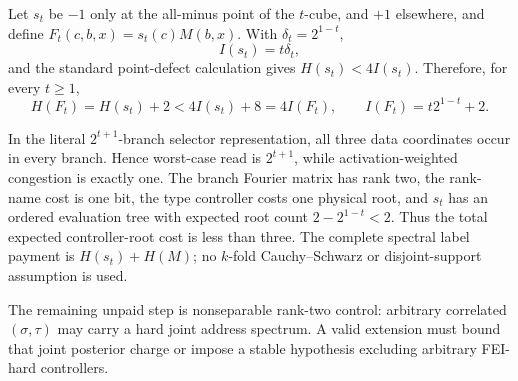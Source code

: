 Let $s_t$ be $-1$ only at the all-minus point of the $t$-cube, and $+1$
elsewhere, and define $F_t(c,b,x)=s_t(c)M(b,x)$.  With
$\delta_t=2^{1-t}$,
\[
 I(s_t)=t\delta_t,
\]
and the standard point-defect calculation gives $H(s_t)<4I(s_t)$.
Therefore, for every $t\ge1$,
\[
 H(F_t)=H(s_t)+2<4I(s_t)+8=4I(F_t),
 \qquad I(F_t)=t2^{1-t}+2.
\]

In the literal $2^{t+1}$-branch selector representation, all three data
coordinates occur in every branch.  Hence worst-case read is $2^{t+1}$,
while activation-weighted congestion is exactly one.  The branch Fourier
matrix has rank two, the rank-name cost is one bit, the type controller costs
one physical root, and $s_t$ has an ordered evaluation tree with expected
root count $2-2^{1-t}<2$.  Thus the total expected controller-root cost is
less than three.  The complete spectral label payment is $H(s_t)+H(M)$;
no $k$-fold Cauchy--Schwarz or disjoint-support assumption is used.

The remaining unpaid step is nonseparable rank-two control: arbitrary
correlated $(\sigma,\tau)$ may carry a hard joint address spectrum.  A valid
extension must bound that joint posterior charge or impose a stable
hypothesis excluding arbitrary FEI-hard controllers.
